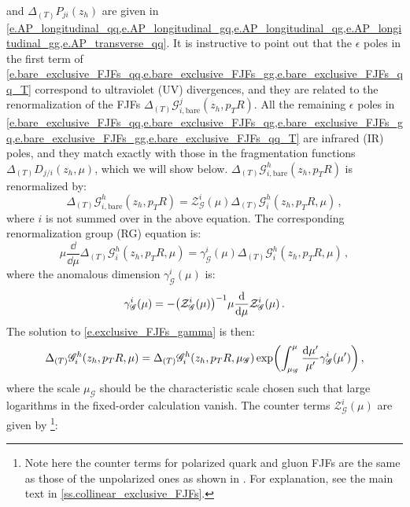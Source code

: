 \documentclass[a4paper, 11 pt]{article}
\begin{document}
and $\Delta_{(T)}{P}_{j i}(z_h)$ are given in \cref{e.AP_longitudinal_qq,e.AP_longitudinal_gq,e.AP_longitudinal_qg,e.AP_longitudinal_gg,e.AP_transverse_qq}.
It is instructive to point out that the $\epsilon$ poles in the first term of \cref{e.bare_exclusive_FJFs_qq,e.bare_exclusive_FJFs_gg,e.bare_exclusive_FJFs_qq_T} correspond to ultraviolet (UV) divergences, and they are related to the renormalization of the FJFs $\Delta_{(T)}\mathscr{G}_{i, \text{bare}}^j (z_h, p_T R)$.
All the remaining $\epsilon$ poles in \cref{e.bare_exclusive_FJFs_qq,e.bare_exclusive_FJFs_qg,e.bare_exclusive_FJFs_gq,e.bare_exclusive_FJFs_gg,e.bare_exclusive_FJFs_qq_T} are infrared (IR) poles, and they match exactly with those in the fragmentation functions $\Delta_{(T)}D_{j/i}(z_h, \mu)$, which we will show below.
$\Delta_{(T)}\mathscr{G}_{i, \text{bare}}^h (z_h, p_T R)$ is renormalized by:
\begin{equation}
\Delta _{(T)} \mathscr{G}_{i, \text{bare}}^h (z_h, p_T R)
=
\mathcal{Z}_{\mathscr{G}}^i(\mu)
\Delta _{(T)} \mathscr{G}_i^h (z_h, p_TR, \mu)\,,
\end{equation}
where $i$ is not summed over in the above equation.
The corresponding renormalization group (RG) equation is:
\begin{equation}
\mu \frac{\dd{}}{\dd{\mu}} \Delta _{(T)} \mathscr{G}_i^h (z_h, p_TR, \mu)
=
\gamma _{\mathscr{G}}^i(\mu) \Delta _{(T)} \mathscr{G}_i^h (z_h, p_TR, \mu)\,,
\end{equation}
where the anomalous dimension $\gamma_{\mathscr{G}}^i(\mu)$ is:
\begin{equation} \label{e.exclusive_FJFs_gamma}
\gamma _{\mathscr{G}}^i(\mu)
=
- \pqty{\mathcal{Z}_{\mathscr{G}}^i(\mu)}^{-1}
\mu \frac{\dd{}}{\dd{\mu}} \mathcal{Z}_{\mathscr{G}}^i(\mu)\, .
\end{equation}
The solution to \cref{e.exclusive_FJFs_gamma} is then:
\begin{equation}
\Delta _{(T)}\mathscr{G}_i^h (z_h, p_TR, \mu)
=
\Delta _{(T)}\mathscr{G}_i^h \pqty{z_h, p_TR, \mu_{\mathscr{G}}}
\exp(\int _{\mu_{\mathscr{G}}}^{\mu} \frac{\dd{\mu '}}{\mu '} \gamma _{\mathscr{G}}^i \pqty{\mu '}) \,,
\end{equation}
where the scale $\mu_{\mathscr{G}}$ should be the characteristic scale chosen such that large logarithms in the fixed-order calculation vanish.
The counter terms $\mathcal{Z}_{\mathscr{G}}^i(\mu)$ are given by%
\footnote{Note here the counter terms for polarized quark and gluon FJFs are the same as those of the unpolarized ones as shown in \cite{Chien:2015ctp}.
For explanation, see the main text in \cref{ss.collinear_exclusive_FJFs}.}:
\end{document}
